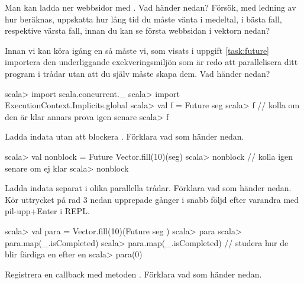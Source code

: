 \Subtask Man kan ladda ner webbsidor med . Vad händer nedan? Försök, med ledning av hur  beräknas, uppskatta hur lång tid du måste vänta i medeltal, i bästa fall, respektive värsta fall, innan du kan se första webbsidan i vektorn  nedan?


\Subtask Innan vi kan köra igång en  så måste vi, som visats i uppgift \ref{task:future} importera den underliggande exekveringsmiljön som är redo att parallelisera ditt program i trådar utan att du själv måste skapa dem. Vad händer nedan?
\begin{REPL}
scala> import scala.concurrent._
scala> import ExecutionContext.Implicits.global
scala> val f = Future{ seg }
scala> f   // kolla om den är klar annars prova igen senare
scala> f
\end{REPL}

\Subtask Ladda indata utan att blockera . Förklara vad som händer nedan.
\begin{REPL}
scala> val nonblock = Future{ Vector.fill(10)(seg) }
scala> nonblock   // kolla igen senare om ej klar
scala> nonblock
\end{REPL}

\Subtask Ladda indata separat i olika parallella trådar. Förklara vad som händer nedan. Kör uttrycket på rad 3 nedan upprepade gånger i snabb följd efter varandra med pil-upp+Enter i REPL.
\begin{REPL}
scala> val para = Vector.fill(10)(Future{ seg })
scala> para
scala> para.map(_.isCompleted)
scala> para.map(_.isCompleted) // studera hur de blir färdiga en efter en
scala> para(0)
\end{REPL}

\Subtask Registrera en callback med metoden . Förklara vad som händer nedan.


